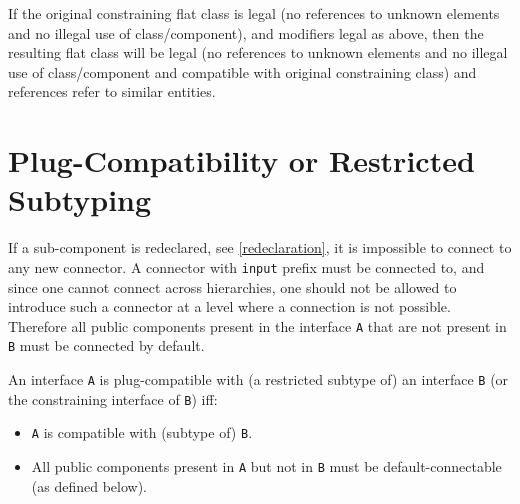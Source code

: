 \begin{nonnormative}
If the original constraining flat class is legal (no references to unknown elements and no illegal use of class/component), and modifiers legal as above, then the resulting flat class will be legal
(no references to unknown elements and no illegal use of class/component and compatible with original constraining class) and references refer to similar entities.
\end{nonnormative}

\section{Plug-Compatibility or Restricted Subtyping}\label{plug-compatibility-or-restricted-subtyping}

\begin{nonnormative}
If a sub-component is redeclared, see \cref{redeclaration}, it is impossible to connect to any new connector.
A connector with \lstinline!input! prefix must be connected to, and since one cannot connect across hierarchies, one should not be allowed to introduce such a connector at a level where a connection is not possible.
Therefore all public components present in the interface \lstinline!A! that are not present in \lstinline!B! must be connected by default.
\end{nonnormative}

\begin{definition}[Plug-compatibility (= restricted subtyping)]%
%
An interface \lstinline!A! is plug-compatible with (a restricted subtype of) an interface \lstinline!B! (or the constraining interface of \lstinline!B!) iff:
\begin{itemize}
\item
  \lstinline!A! is compatible with (subtype of) \lstinline!B!.
\item
  All public components present in \lstinline!A! but not in \lstinline!B! must be default-connectable (as defined below).
\end{itemize}
\end{definition}

